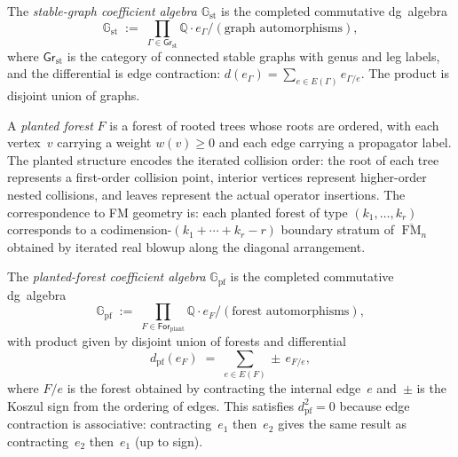\begin{definition}
\label{def:stable-graph-coefficient-algebra}
The \emph{stable-graph coefficient algebra} $\mathbb{G}_{\mathrm{st}}$
is the completed commutative dg~algebra
\begin{equation}
\label{eq:stable-graph-coefficient-algebra}
\mathbb{G}_{\mathrm{st}}
\;:=\;
\prod_{\Gamma \in \mathsf{Gr}_{\mathrm{st}}}
\mathbb{Q}\cdot e_{\Gamma}
\Big/
(\text{graph automorphisms}),
\end{equation}
where $\mathsf{Gr}_{\mathrm{st}}$ is the category of connected stable
graphs with genus and leg labels, and the differential is edge
contraction:
$d(e_\Gamma) = \sum_{e \in E(\Gamma)} e_{\Gamma/e}$.
The product is disjoint union of graphs.
\end{definition}

\begin{definition}
\label{def:planted-forest-coefficient-algebra}
A \emph{planted forest} $F$ is a forest of rooted trees whose roots
are ordered, with each vertex~$v$ carrying a weight $w(v) \geq 0$ and
each edge carrying a propagator label.  The planted structure encodes
the iterated collision order: the root of each tree represents a
first-order collision point, interior vertices represent higher-order
nested collisions, and leaves represent the actual operator
insertions.  The correspondence to FM geometry is: each planted forest
of type $(k_1, \ldots, k_r)$ corresponds to a
codimension-$(k_1 + \cdots + k_r - r)$ boundary stratum of
$\overline{\operatorname{FM}}_n$ obtained by iterated real blowup
along the diagonal arrangement.

The \emph{planted-forest coefficient algebra}
$\mathbb{G}_{\mathrm{pf}}$ is the completed commutative dg~algebra
\begin{equation}
\label{eq:planted-forest-coefficient-algebra}
\mathbb{G}_{\mathrm{pf}}
\;:=\;
\prod_{F \in \mathsf{For}_{\mathrm{plant}}}
\mathbb{Q}\cdot e_{F}
\Big/
(\text{forest automorphisms}),
\end{equation}
with product given by disjoint union of forests and differential
\begin{equation}
\label{eq:planted-forest-differential}
d_{\mathrm{pf}}(e_F)
\;=\;
\sum_{e \in E(F)} \pm\, e_{F/e},
\end{equation}
where $F/e$ is the forest obtained by contracting the internal edge~$e$
and~$\pm$ is the Koszul sign from the ordering of edges.  This
satisfies $d_{\mathrm{pf}}^2 = 0$ because edge contraction is
associative: contracting~$e_1$ then~$e_2$ gives the same result as
contracting~$e_2$ then~$e_1$ (up to sign).
\end{definition}

